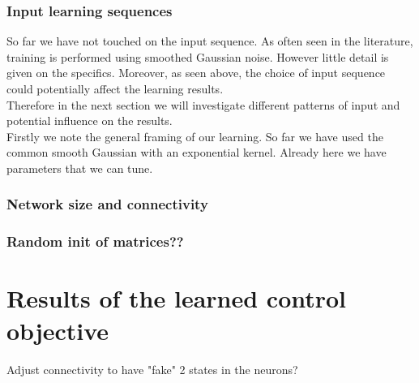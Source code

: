 \subsubsection{Input learning sequences}
So far we have not touched on the input sequence. As often seen in the literature, training is performed using smoothed Gaussian noise. However little detail is given on the specifics. Moreover, as seen above, the choice of input sequence could potentially affect the learning results.\\
Therefore in the next section we will investigate different patterns of input and potential influence on the results.\\
Firstly we note the general framing of our learning. So far we have used the common smooth Gaussian with an exponential kernel. Already here we have parameters that we can tune.\\



\subsubsection{Network size and connectivity}
\subsubsection{Random init of matrices??}

\section{Results of the learned control objective}
Adjust connectivity to have "fake" 2 states in the neurons?
